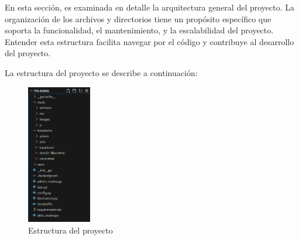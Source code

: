 \documentclass[a4paper, 12pt]{book}
\begin{document}
En esta sección, es examinada en detalle la arquitectura general del proyecto. La organización de los archivos y directorios tiene un propósito específico que soporta 
la funcionalidad, el mantenimiento, y la escalabilidad del proyecto. Entender esta estructura facilita navegar por el código y contribuye al desarrollo del proyecto.

La estructura del proyecto se describe a continuación:

\begin{figure}
  \centering
  \includegraphics[width=0.25\textwidth]{img/estructura.png}
  \caption{Estructura del proyecto}
  \label{fig:estructura}
\end{figure}
\end{document}
